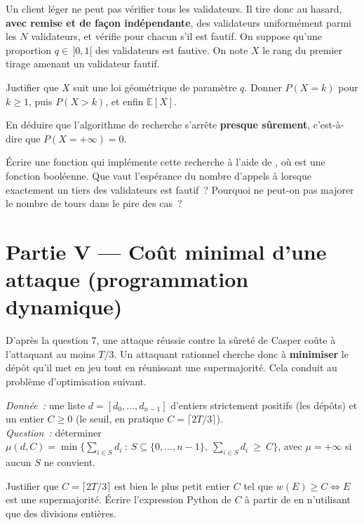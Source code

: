 \documentclass[11pt,a4paper]{article}
\begin{document}
Un client léger ne peut pas vérifier tous les validateurs. Il tire donc au hasard,
\textbf{avec remise et de façon indépendante}, des validateurs uniformément parmi les $N$
validateurs, et vérifie pour chacun s'il est fautif. On suppose qu'une proportion
$q\in\,]0,1[$ des validateurs est fautive. On note $X$ le rang du premier tirage amenant un
validateur fautif.

\Q Justifier que $X$ suit une loi géométrique de paramètre $q$. Donner $P(X=k)$ pour
$k\ge 1$, puis $P(X>k)$, et enfin $\mathbb{E}[X]$.

\Q En déduire que l'algorithme de recherche s'arrête \textbf{presque sûrement}, c'est-à-dire
que $P(X=+\infty)=0$.

\Q Écrire une fonction  qui implémente cette
recherche à l'aide de , où  est une fonction
booléenne. Que vaut l'espérance du nombre d'appels à  lorsque exactement un
tiers des validateurs est fautif~? Pourquoi ne peut-on pas majorer le nombre de tours dans
le pire des cas~?

\section*{Partie V --- Coût minimal d'une attaque (programmation dynamique)}

D'après la question 7, une attaque réussie contre la sûreté de Casper coûte à l'attaquant au
moins $T/3$. Un attaquant rationnel cherche donc à \textbf{minimiser} le dépôt qu'il met en
jeu tout en réunissant une supermajorité. Cela conduit au problème d'optimisation suivant.

\begin{defi}
\emph{Donnée~:} une liste $d=[d_0,\dots,d_{n-1}]$ d'entiers strictement positifs (les
dépôts) et un entier $C\ge 0$ (le seuil, en pratique $C=\lceil 2T/3\rceil$).\\
\emph{Question~:} déterminer
$\displaystyle \mu(d,C)=\min\Big\{\textstyle\sum_{i\in S} d_i \ :\ S\subseteq
\{0,\dots,n-1\},\ \sum_{i\in S} d_i\ \ge\ C\Big\}$, avec $\mu=+\infty$ si aucun $S$ ne
convient.
\end{defi}

\Q Justifier que $C=\lceil 2T/3\rceil$ est bien le plus petit entier $C$ tel que
$w(E)\ge C \iff E$ est une supermajorité. Écrire l'expression Python de $C$ à partir de
 en n'utilisant que des divisions entières.
\end{document}
